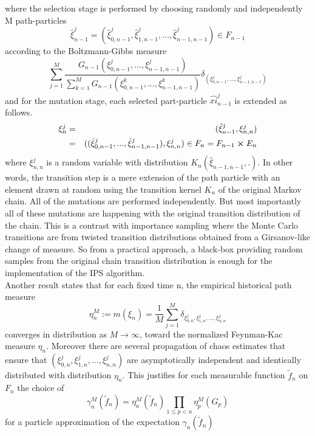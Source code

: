where the selection stage is performed by choosing randomly and independently M path-particles
$$\hat{\xi}_{n-1}^j = (\hat{\xi}_{0,n-1}^j, \hat{\xi}_{1,n-1}^j,...,\hat{\xi}_{n-1,n-1}^j) \in F_{n-1}$$
according to the Boltzmann-Gibbs measure
\begin{equation}
	\sum_{j=1}^{M} \frac{G_{n-1}(\xi_{0,n-1}^j,...,\xi_{n-1,n-1}^j)}{\sum_{k=1}^{M}G_{n-1}(\xi_{0,n-1}^k,...,\xi_{n-1,n-1}^k)} \delta_{(\xi_{0,n-1}^j,...,\xi_{n-1,n-1}^j)}
\end{equation}
and for the mutation stage, each selected part-particle $\hat{xi}_{n-1}^j$ is extended as follows.
\begin{eqnarray*}
	\xi_n^j & = & (\hat{\xi}_{n-1}^j, \xi_{n,n}^j)\\
	& = & ((\hat{\xi}_{0,n-1}^j,..., \hat{\xi}_{n-1,n-1}^j), \xi_{n,n}^j) \in F_n = F_{n-1} \cross E_n
\end{eqnarray*}
where $\xi_{n,n}^j$ is a random variable with distribution $K_n(\hat{\xi}_{n-1,n-1},.)$. In other words, the transition step is a mere extension of the path particle with an element drawn at random using the transition kernel $K_n$ of the original Markov chain. All of the mutations are performed independently. But most importantly all of these mutations are happening with the original transition distribution of the chain. This is a contrast with importance sampling where the Monte Carlo transitions are from twisted transition distributions obtained from a Girsanov-like change of measure. So from a practical approach, a black-box providing random samples from the original chain transition distribution is enough for the implementation of the IPS algorithm.\\

Another result states that for each fixed time n, the empirical historical path measure
$$\eta_n^M := m(\xi_n) = \frac{1}{M} \sum_{j=1}^{M} \delta_{\xi_{0,n}^j,\xi_{1,n}^j,...,\xi_{n,n}^j}$$ converges in distribution as $M \rightarrow \infty$, toward the normalized Feynman-Kac measure $\eta_n$. Moreover there are several propagation of chaos estimates that ensure that $(\xi_{0,n}^j, \xi_{1,n}^j,...,\xi_{n,n}^j)$ are asymptotically independent and identically distributed with distribution $\eta_n$. This justifies for each measurable function $\tilde{f}_n$ on $F_n$ the choice of
\begin{equation}
	\gamma_n^M(\tilde{f}_n) = \eta_n^M(\tilde{f}_n) \prod_{1\leq p <n}\eta_p^M(G_p)
\end{equation}
for a particle approximation of the expectation $\gamma_n(\tilde{f}_n)$

